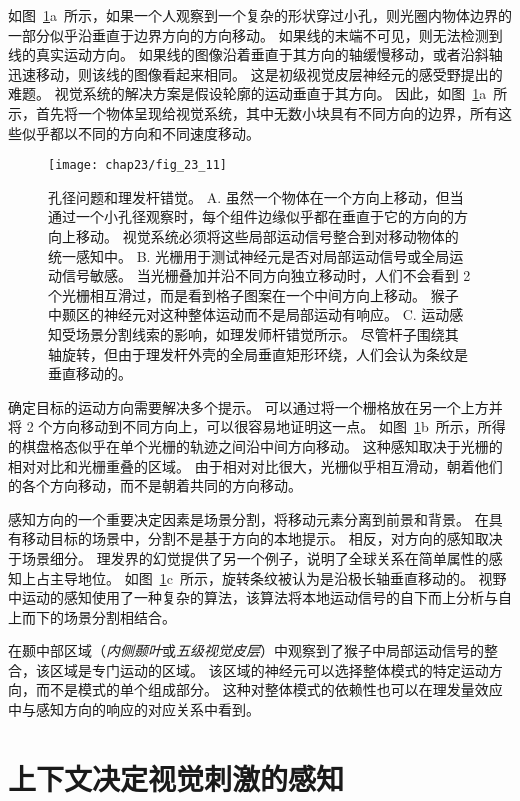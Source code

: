如图~\ref{fig:23_11}a~所示，如果一个人观察到一个复杂的形状穿过小孔，则光圈内物体边界的一部分似乎沿垂直于边界方向的方向移动。
如果线的末端不可见，则无法检测到线的真实运动方向。 
如果线的图像沿着垂直于其方向的轴缓慢移动，或者沿斜轴迅速移动，则该线的图像看起来相同。
这是初级视觉皮层神经元的感受野提出的难题。 
视觉系统的解决方案是假设轮廓的运动垂直于其方向。 
因此，如图~\ref{fig:23_11}a~所示，首先将一个物体呈现给视觉系统，其中无数小块具有不同方向的边界，所有这些似乎都以不同的方向和不同速度移动。


\begin{figure}[htbp]
	\centering
	\texttt{[image: chap23/fig\_23\_11]}
	\caption{孔径问题和理发杆错觉。
		A. 虽然一个物体在一个方向上移动，但当通过一个小孔径观察时，每个组件边缘似乎都在垂直于它的方向的方向上移动。
		视觉系统必须将这些局部运动信号整合到对移动物体的统一感知中。
		B. 光栅用于测试神经元是否对局部运动信号或全局运动信号敏感。
		当光栅叠加并沿不同方向独立移动时，人们不会看到 2 个光栅相互滑过，而是看到格子图案在一个中间方向上移动。
		猴子中颞区的神经元对这种整体运动而不是局部运动有响应。
		C. 运动感知受场景分割线索的影响，如理发师杆错觉所示。
		尽管杆子围绕其轴旋转，但由于理发杆外壳的全局垂直矩形环绕，人们会认为条纹是垂直移动的。}
	\label{fig:23_11}
\end{figure}


确定目标的运动方向需要解决多个提示。
可以通过将一个栅格放在另一个上方并将 2 个方向移动到不同方向上，可以很容易地证明这一点。
如图~\ref{fig:23_11}b~所示，所得的棋盘格态似乎在单个光栅的轨迹之间沿中间方向移动。
这种感知取决于光栅的相对对比和光栅重叠的区域。
由于相对对比很大，光栅似乎相互滑动，朝着他们的各个方向移动，而不是朝着共同的方向移动。


感知方向的一个重要决定因素是场景分割，将移动元素分离到前景和背景。
在具有移动目标的场景中，分割不是基于方向的本地提示。
相反，对方向的感知取决于场景细分。
理发界的幻觉提供了另一个例子，说明了全球关系在简单属性的感知上占主导地位。
如图~\ref{fig:23_11}c~所示，旋转条纹被认为是沿极长轴垂直移动的。
视野中运动的感知使用了一种复杂的算法，该算法将本地运动信号的自下而上分析与自上而下的场景分割相结合。


在颞中部区域（\textit{内侧颞叶}或\textit{五级视觉皮层}）中观察到了猴子中局部运动信号的整合，该区域是专门运动的区域。
该区域的神经元可以选择整体模式的特定运动方向，而不是模式的单个组成部分。
这种对整体模式的依赖性也可以在理发量效应中与感知方向的响应的对应关系中看到。



\section{上下文决定视觉刺激的感知}


